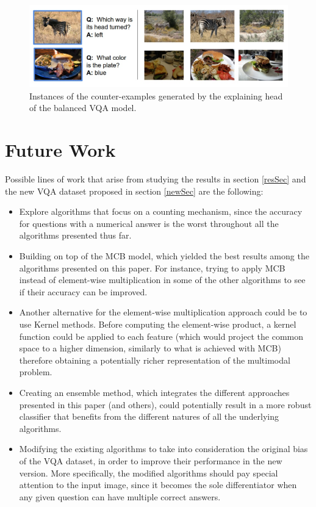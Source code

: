 \documentclass{article}
\begin{document}
    \begin{figure}[ht]
    	\centering
            \includegraphics[width=1.0\linewidth]{balancedCounter.PNG}
        \caption{Instances of the counter-examples generated by the explaining head of the balanced VQA model.}
    	\label{balancedCounter}
    \end{figure}

\section{Future Work}\label{futureSec}
Possible lines of work that arise from studying the results in section \ref{resSec} and the new VQA dataset proposed in section \ref{newSec} are the following:
    \begin{itemize}
        \item Explore algorithms that focus on a counting mechanism, since the accuracy for questions with a numerical answer is the worst throughout all the algorithms presented thus far.
        \item Building on top of the MCB model, which yielded the best results among the algorithms presented on this paper. For instance, trying to apply MCB instead of element-wise multiplication in some of the other algorithms to see if their accuracy can be improved.
        \item Another alternative for the element-wise multiplication approach could be to use Kernel methods. Before computing the element-wise product, a kernel function could be applied to each feature (which would project the common space to a higher dimension, similarly to what is achieved with MCB) therefore obtaining a potentially richer representation of the multimodal problem.
        \item Creating an ensemble method, which integrates the different approaches presented in this paper (and others), could potentially result in a more robust classifier that benefits from the different natures of all the underlying algorithms.
        \item Modifying the existing algorithms to take into consideration the original bias of the VQA dataset, in order to improve their performance in the new version. More specifically, the modified algorithms should pay special attention to the input image, since it becomes the sole differentiator when any given question can have multiple correct answers.
    \end{itemize}
\end{document}
